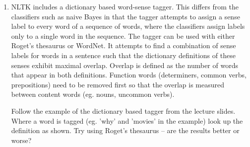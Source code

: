 \documentclass{worksheet}
\begin{document}
\begin{enumerate}
\item NLTK includes a dictionary based word-sense tagger. This differs from
the classifiers such as naive Bayes in that the tagger attempts to assign a
sense label to every word of a sequence of words, where the classifiers
assign labels only to a single word in the sequence. The tagger can be used
with either Roget's thesaurus or WordNet. It attempts to find a combination
of sense labels for words in a sentence such that the dictionary definitions
of these senses exhibit maximal overlap. Overlap is defined as the number of
words that appear in both definitions. Function words (determiners, common
verbs, prepositions) need to be removed first so that the overlap is measured
between content words (eg. nouns, uncommon verbs).

Follow the example of the dictionary based tagger from the lecture slides.
Where a word is tagged (eg. 'why' and 'movies' in the example) look up the
definition as shown. Try using Roget's thesaurus -- are the results better or
worse?

\end{enumerate}
\end{document}

